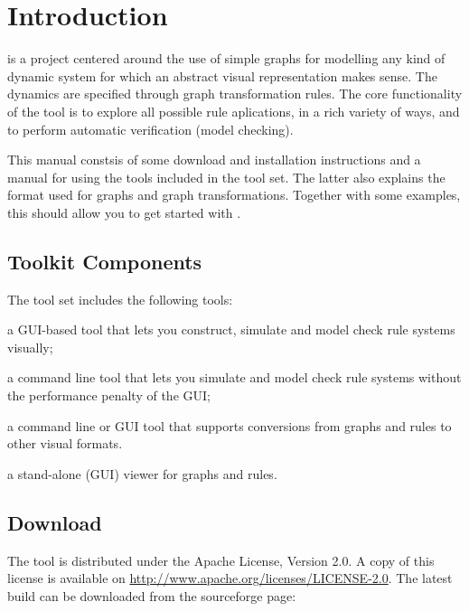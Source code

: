 \clearpage
\section{Introduction}

\GROOVE is a project centered around the use of simple graphs for modelling
any kind of dynamic system for which an abstract visual representation makes sense. The dynamics are specified through graph transformation rules. The core functionality of the tool is to explore all possible rule aplications, in a rich variety of ways, and to perform automatic verification (model checking).

This manual constsis of some download and installation instructions and a
manual for using the tools included in the \GROOVE tool set. The latter also
explains the format used for graphs and graph transformations. Together
with some examples, this should allow you to get started with \GROOVE.

\subsection{Toolkit Components}

The \GROOVE tool set includes the following tools:
\begin{description}\noitemsep
\item[Simulator:] a GUI-based tool that lets you construct, simulate and
  model check rule systems visually;
\item[Generator:] a command line tool that lets you simulate and model check
  rule systems without the performance penalty of the GUI;
\item[Imager:] a command line or GUI tool that supports conversions from
  \GROOVE graphs and rules to other visual formats.
\item[Viewer:] a stand-alone (GUI) viewer for \GROOVE graphs and rules.
\end{description}

\subsection{Download}

The \GROOVE tool is distributed under the Apache License, Version 2.0. A copy
of this license is available on
\url{http://www.apache.org/licenses/LICENSE-2.0}.  The latest \GROOVE build
can be downloaded from the \GROOVE sourceforge page:

